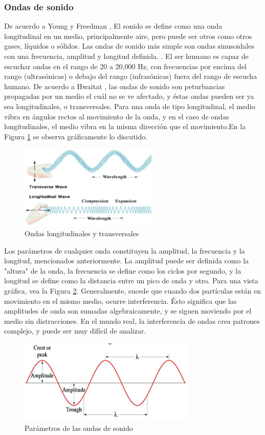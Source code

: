 \documentclass[12pt, letterpaper]{article}
\begin{document}
\subsubsection{Ondas de sonido}
De acuerdo a Young y Freedman \cite{university-physics}, El sonido se define como una onda 
longitudinal en un medio, principalmente aire, pero puede ser otros como otros gases, líquidos o sólidos. Las 
ondas de sonido más simple son ondas sinusoidales con una frecuencia, amplitud y longitud definida. 
\cite{university-physics}. El ser humano es capaz de escuchar ondas en el rango de 20 a 20,000 Hz, con 
frecuencias por encima del rango (ultrasónicas) o debajo del rango (infrasónicas) fuera del rango de escucha humano. 
De acuerdo a Hwaitat \cite{frequencies-wave-sound-pso}, las ondas de sonido son peturbancias propagadas por un medio el cuál 
no se ve afectado, y éstas ondas pueden ser ya sea longitudinales, o transversales. Para una onda 
de tipo longitudinal, el medio vibra en ángulos rectos al movimiento de la onda, y en el caso de ondas longitudinales, 
el medio vibra en la misma dirección que el movimiento.En la Figura \ref*{Ondas Longitudinales} se observa gráficamente lo discutido. 
\begin{figure}[H]
  \centering
  \includegraphics[height = 4cm]{ondas_longitudinales_transversales.png}
  \caption{Ondas longitudinales y transversales}
  \label{Ondas Longitudinales}
\end{figure}
Los parámetros de cualquier onda constituyen la amplitud, la frecuencia 
y la longitud, mencionados anteriormente. La amplitud puede ser definida como la "altura" 
de la onda, la frecuencia se define como los ciclos por segundo, y la longitud se define como la distancia 
entre un pico de onda y otro. Para una vista gráfica, vea la Figura \ref*{parametros-ondas}. Generalmente, sucede que 
cuando dos partículas están en movimiento en el mismo medio, ocurre interferencia. Ésto significa que 
las amplitudes de onda son sumadas algebraicamente, y se siguen moviendo por el medio sin distracciones. En el mundo real, 
la interferencia de ondas crea patrones complejo, y puede ser muy difícil de analizar.  
\begin{figure}[H]
  \centering
  \includegraphics[height = 4cm]{parametros-ondas.png}
  \caption{Parámetros de las ondas de sonido}
  \label{parametros-ondas}
\end{figure}
\end{document}
